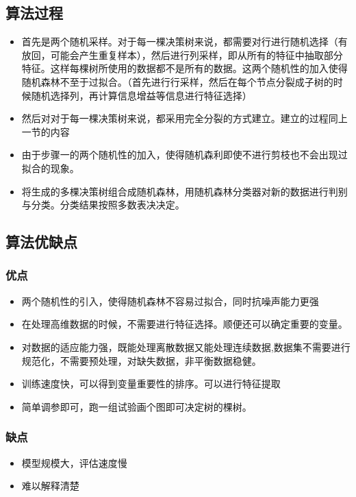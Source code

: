 	\subsection{算法过程}
	\begin{itemize}
		\item 首先是两个随机采样。对于每一棵决策树来说，都需要对行进行随机选择（有放回，可能会产生重复样本），然后进行列采样，即从所有的特征中抽取部分特征。这样每棵树所使用的数据都不是所有的数据。这两个随机性的加入使得随机森林不至于过拟合。（首先进行行采样，然后在每个节点分裂成子树的时候随机选择列，再计算信息增益等信息进行特征选择）
		\item 然后对对于每一棵决策树来说，都采用完全分裂的方式建立。建立的过程同上一节的内容
		\item 由于步骤一的两个随机性的加入，使得随机森利即使不进行剪枝也不会出现过拟合的现象。
		\item 将生成的多棵决策树组合成随机森林，用随机森林分类器对新的数据进行判别与分类。分类结果按照多数表决决定。
	\end{itemize}
	
	
	\subsection{算法优缺点}
	\subsubsection{优点}
	\begin{itemize}
		\item 两个随机性的引入，使得随机森林不容易过拟合，同时抗噪声能力更强
		\item 在处理高维数据的时候，不需要进行特征选择。顺便还可以确定重要的变量。
		\item 对数据的适应能力强，既能处理离散数据又能处理连续数据,数据集不需要进行规范化，不需要预处理，对缺失数据，非平衡数据稳健。
		\item 训练速度快，可以得到变量重要性的排序。可以进行特征提取
		\item 简单调参即可，跑一组试验画个图即可决定树的棵树。
	\end{itemize}
	\subsubsection{缺点}
	\begin{itemize}
		\item 模型规模大，评估速度慢
		\item 难以解释清楚
	\end{itemize}
	
